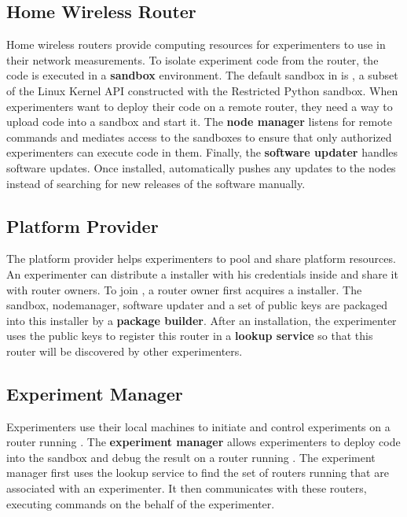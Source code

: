 \subsection{Home Wireless Router}
Home wireless routers provide computing resources for experimenters to use in their network measurements. To isolate experiment code from the router, the code is executed in a \textbf{sandbox} environment. The default sandbox in \sysname is \sandboxname, a subset of the Linux Kernel API constructed with the Restricted Python sandbox. When experimenters want to deploy their code on a remote router, they need a way to upload code into a sandbox and start it. The \textbf{node manager} listens for remote commands and mediates access to the sandboxes to ensure that only authorized experimenters can execute code in them. Finally, the \textbf{software updater} handles software updates. Once installed, automatically pushes any updates to the nodes instead of searching for new releases of the software manually.  

\subsection{Platform Provider}
The platform provider helps experimenters to pool and share platform resources. An experimenter can distribute a \sysname installer with his credentials inside and share it with router owners. To join \sysname, a router owner first acquires a \sysname installer. The sandbox, nodemanager, software updater and a set of public keys are packaged into this installer by a \textbf{package builder}. After an installation, the experimenter uses the public keys to register this router in a \textbf{lookup service} so that this router will be discovered by other experimenters.

\subsection{Experiment Manager}
Experimenters use their local machines to initiate and control experiments on a router running \sysname. The \textbf{experiment manager} allows experimenters to deploy code into the sandbox and debug the result on a router running \sysname. The experiment manager first uses the lookup service to find the set of routers running \sysname that are associated with an experimenter. It then communicates with these routers, executing commands on the behalf of the experimenter.  

